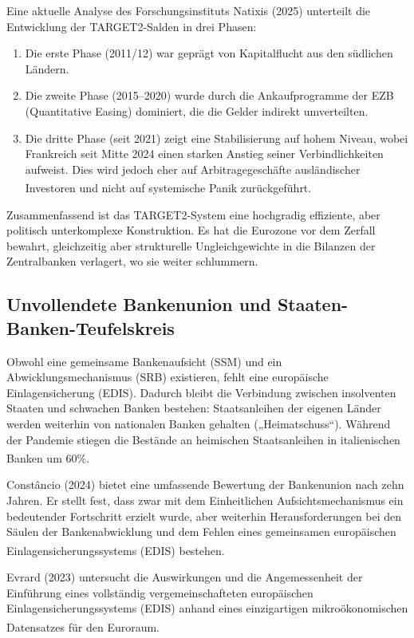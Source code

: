 \documentclass[12pt,a4paper]{article}
\newcommand{\footcite}[1]{\textsuperscript{\cite{#1}}}
\begin{document}
	Eine aktuelle Analyse des Forschungsinstituts Natixis (2025) unterteilt die Entwicklung der TARGET2-Salden in drei Phasen:
	\begin{enumerate}
		\item Die erste Phase (2011/12) war geprägt von Kapitalflucht aus den südlichen Ländern.
		\item Die zweite Phase (2015–2020) wurde durch die Ankaufprogramme der EZB (Quantitative Easing) dominiert, die die Gelder indirekt umverteilten.
		\item Die dritte Phase (seit 2021) zeigt eine Stabilisierung auf hohem Niveau, wobei Frankreich seit Mitte 2024 einen starken Anstieg seiner Verbindlichkeiten aufweist. Dies wird jedoch eher auf Arbitragegeschäfte ausländischer Investoren und nicht auf systemische Panik zurückgeführt.\footcite{Natixis2025}
	\end{enumerate}
	
	Zusammenfassend ist das TARGET2-System eine hochgradig effiziente, aber politisch unterkomplexe Konstruktion. Es hat die Eurozone vor dem Zerfall bewahrt, gleichzeitig aber strukturelle Ungleichgewichte in die Bilanzen der Zentralbanken verlagert, wo sie weiter schlummern.
	
	\subsection{Unvollendete Bankenunion und Staaten-Banken-Teufelskreis}
	
	Obwohl eine gemeinsame Bankenaufsicht (SSM) und ein Abwicklungsmechanismus (SRB) existieren, fehlt eine europäische Einlagensicherung (EDIS). Dadurch bleibt die Verbindung zwischen insolventen Staaten und schwachen Banken bestehen: Staatsanleihen der eigenen Länder werden weiterhin von nationalen Banken gehalten („Heimatschuss“). Während der Pandemie stiegen die Bestände an heimischen Staatsanleihen in italienischen Banken um 60\%.\footcite{ECB2023}
	
	Constâncio (2024) bietet eine umfassende Bewertung der Bankenunion nach zehn Jahren. Er stellt fest, dass zwar mit dem Einheitlichen Aufsichtsmechanismus ein bedeutender Fortschritt erzielt wurde, aber weiterhin Herausforderungen bei den Säulen der Bankenabwicklung und dem Fehlen eines gemeinsamen europäischen Einlagensicherungssystems (EDIS) bestehen.\footcite{Constancio2024}
	
	Evrard (2023) untersucht die Auswirkungen und die Angemessenheit der Einführung eines vollständig vergemeinschafteten europäischen Einlagensicherungssystems (EDIS) anhand eines einzigartigen mikroökonomischen Datensatzes für den Euroraum.\footcite{Evrard2023}
	
\end{document}
